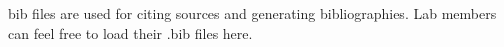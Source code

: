 bib files are used for citing sources and generating bibliographies.  Lab members can feel free to load their .bib files here.